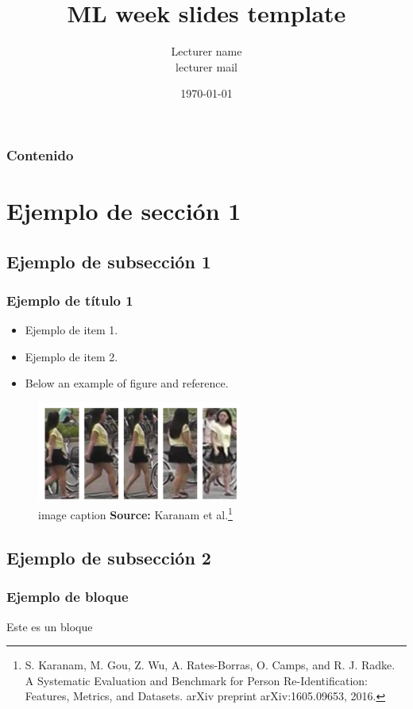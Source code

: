 \documentclass{beamer}
\title{ML week slides template}
\institute{EEPP IIS-UNSAAC}
\author{Lecturer name\\
        lecturer mail}
\date{\today}
\newcommand{\etal}{et al.}
\begin{document}
\frame{\titlepage}

\begin{frame}
    \frametitle{Contenido}
    \footnotesize{
    \tableofcontents
    }
\end{frame}
  
  
\section{Ejemplo de sección 1} %
\subsection{Ejemplo de subsección 1}
\begin{frame} 
   \frametitle{Ejemplo de título 1}
   \begin{itemize}
   \item Ejemplo de item 1.
   \item Ejemplo de item 2.
   \item Below an example of figure and reference.
   \end{itemize}
   \begin{figure}[!htb]
        \centering
        \includegraphics[width=0.6\textwidth]{figs/re-id1.png}
        \caption{image caption  \textbf{Source:} Karanam \etal\footnote{S. Karanam, M. Gou, Z. Wu, A. Rates-Borras, O. Camps, and R. J. Radke. A Systematic Evaluation and Benchmark for Person Re-Identification: Features, Metrics, and Datasets. arXiv preprint arXiv:1605.09653, 2016.}}
    \end{figure}
\end{frame}

\subsection{Ejemplo de subsección 2}
\begin{frame}
    \frametitle{Ejemplo de bloque}
    \begin{block}{}
    Este es un bloque
    \end{block}
\end{frame}
\end{document}
